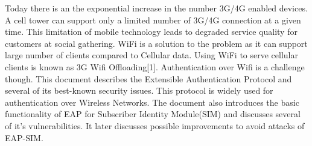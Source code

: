 Today there is an the exponential increase in the number 3G/4G enabled devices. A cell
tower can support only a limited number of 3G/4G connection at a given time. This limitation of mobile technology leads to degraded service quality for customers at social gathering. WiFi is a solution to the problem as it can support large number of clients compared to Cellular data. Using WiFi to serve cellular clients is known as 3G Wifi Offloading[1]. Authentication over Wifi is a challenge though. This document describes the Extensible Authentication Protocol and several of its best-known security issues. This protocol is widely used for authentication over Wireless Networks. The document also introduces the basic functionality of EAP for Subscriber Identity Module(SIM) and discusses several of it's vulnerabilities. It later discusses possible improvements to avoid attacks of EAP-SIM.


